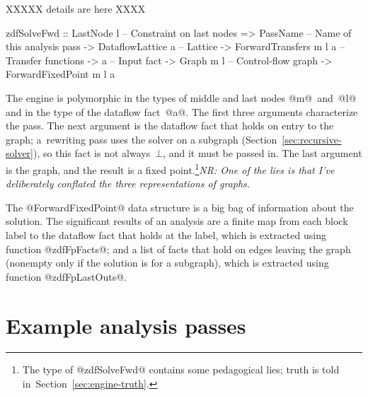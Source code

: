 \documentclass[blockstyle,preprint,nocopyrightspace]{sigplanconf}
\newcommand{\authornote}[1]{{\em #1}}
\newcommand{\norman}[1]{\authornote{NR: #1}}
\let\remark\norman
\newcommand\secref[1]{Section~\ref{sec:#1}}
\newcommand\seclabel[1]{\label{sec:#1}}
\begin{document}
XXXXX details are here XXXX
\begin{code}
  zdfSolveFwd 
    :: LastNode l             -- Constraint on last nodes
    => PassName               -- Name of this analysis pass
    -> DataflowLattice a      -- Lattice
    -> ForwardTransfers m l a -- Transfer functions
    -> a                      -- Input fact
    -> Graph m l              -- Control-flow graph
    -> ForwardFixedPoint m l a
\end{code}
The engine is polymorphic in the types of middle and last nodes
@m@~and~@l@ and in the type of the dataflow fact~@a@.
The first three arguments characterize the pass.
The next argument is the dataflow fact that holds on entry to the graph;
a~rewriting pass uses the solver on a subgraph (\secref{recursive-solver}),
so this fact
is not always~$\bot$, and it must be passed in.
The last argument is the graph, and the result is a 
fixed point.\footnote
{The type of @zdfSolveFwd@ contains some pedagogical lies;
truth is told in~\secref{engine-truth}.}\remark{One of the lies is
that I've deliberately conflated the three representations of graphs.}

The @ForwardFixedPoint@ data structure is a big bag
of information about the solution.
The significant results of an analysis are
a finite map from each block label to the dataflow fact that holds at
the label, which is extracted using function @zdfFpFacts@;
and
a list of facts that hold on edges leaving the graph (nonempty only if
the solution is for a subgraph), which is  
 extracted using function @zdfFpLastOuts@.






\iffalse
\begin{code}
class DataflowSolverDirection
        transfers fixedpt where
  zdfSolveFrom :: (DebugNodes m l, Outputable a)
    => BlockEnv a        -- Init facts
    -> PassName          -- Analysis name
    -> DataflowLattice a -- Lattice
    -> transfers m l a   -- Transfers
    -> a                 -- Input fact
    -> Graph m l         -- CFG
    -> DFMonad (fixedpt m l a ())
\end{code}
\fi



\section{Example analysis passes}

\seclabel{example-analyses}
\end{document}

